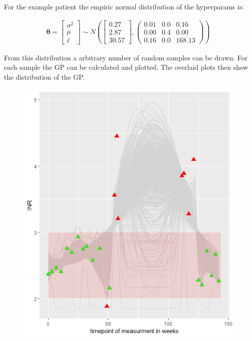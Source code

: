 	For the example patient the empiric normal distribution of the hyperparams is: 
	
	\begin{align}
	\pmb{\theta} = 
	\begin{bmatrix}
	\sigma^{2} \\
	\mu \\
	\ell
	\end{bmatrix}
	\sim N(
	\begin{bmatrix}
	0.27 \\ 2.87 \\ 30.57
	\end{bmatrix}
	,
	\begin{pmatrix}
		0.01 & 0.0 & 0.16 \\
		0.00 & 0.4 & 0.00 \\
		0.16 & 0.0 & 168.13 
	\end{pmatrix}
	) 
	\end{align}
	
	From this distribution a arbitrary number of random samples can be drawn. For each sample the \ac{GP} can be calculated and plotted. The overlaid plots then show the distribution of the \ac{GP}.

    \begin{figure}
    	\centering
    	\includegraphics{./images/overlaid_gp_plots.png}
    	\label{overlaid_gp_plots}
    \end{figure}